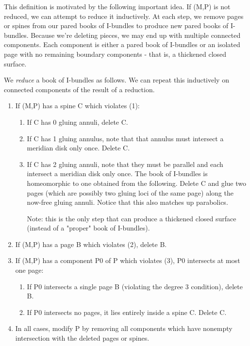 This definition is motivated by the following important idea. If (M,P) is not
reduced, we can attempt to reduce it inductively. At each step, we remove pages
or spines from our pared books of I-bundles to produce new pared books of
I-bundles.  Because we're deleting pieces, we may end up with multiple
connected components. Each component is either a pared book of I-bundles or an
isolated page with no remaining boundary components - that is, a thickened
closed surface.

\begin{defn}

We \emph{reduce} a book of I-bundles as follows. We can repeat this inductively
on connected components of the result of a reduction.

\begin{enumerate}

\item If (M,P) has a spine C which violates (1):

\begin{enumerate}

\item If C has 0 gluing annuli, delete C.

\item If C has 1 gluing annulus, note that that annulus must intersect
a meridian disk only once. Delete C.

\item If C has 2 gluing annuli, note that they must be parallel and each
intersect a meridian disk only once. The book of I-bundles is homeomorphic to
one obtained from the following. Delete C and glue two pages (which are
possibly two gluing loci of the same page) along the now-free gluing annuli.
Notice that this also matches up parabolics.

Note: this is the only step that can produce a thickened closed surface
(instead of a "proper" book of I-bundles).

\end{enumerate}

\item If (M,P) has a page B which violates (2), delete B.

\item If (M,P) has a component P0 of P which violates (3), P0 intersects at
most one page:

\begin{enumerate}

\item If P0 intersects a single page B (violating the degree 3 condition),
delete B.

\item If P0 intersects no pages, it lies entirely inside a spine C. Delete C.

\end{enumerate}

\item In all cases, modify P by removing all components which have nonempty
intersection with the deleted pages or spines.

\end{enumerate}

\end{defn}

